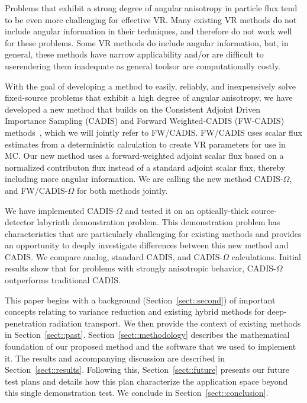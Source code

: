 \documentclass[12pt]{article}
\begin{document}
Problems that exhibit a strong degree of angular anisotropy in particle flux tend to be even more challenging for effective VR.
Many existing VR methods do not include angular information in their techniques, and therefore do not work well for these problems.  
Some VR methods do include angular information, but, in general, these methods have narrow applicability and/or are difficult to use\textemdash rendering them inadequate as general tools\textemdash or are computationally costly.

With the goal of developing a method to easily, reliably, and inexpensively solve fixed-source problems that exhibit a high degree of angular anisotropy, we have developed a new method that builds on the Consistent Adjoint Driven Importance Sampling (CADIS) and Forward Weighted-CADIS (FW-CADIS) methods~\cite{wagner_forward-weighted_2007}, which we will jointly refer to FW/CADIS. 
FW/CADIS uses scalar flux estimates from a deterministic calculation to create VR parameters for use in MC.
Our new method uses a forward-weighted adjoint scalar flux based on a normalized contributon flux instead of a standard adjoint scalar flux, thereby including more angular information. 
We are calling the new method CADIS-$\Omega$, and FW/CADIS-$\Omega$ for both methods jointly.

We have implemented CADIS-$\Omega$ and tested it on an optically-thick source-detector labyrinth demonstration problem.
This demonstration problem has characteristics that are particularly challenging for existing methods and provides an opportunity to deeply investigate differences between this new method and CADIS.
We compare analog, standard CADIS, and CADIS-$\Omega$ calculations. 
Initial results show that for problems with strongly anisotropic behavior, CADIS-$\Omega$ outperforms traditional CADIS.

This paper begins with a background (Section~\ref{sect::second}) of important concepts relating to variance reduction and existing hybrid methods for deep-penetration radiation transport. 
We then provide the context of existing methods in Section~\ref{sect::past}. 
Section~\ref{sect::methodology} describes the mathematical foundation of our proposed method and the software that we used to implement it. 
The results and accompanying discussion are described in Section~\ref{sect::results}. Following this, Section~\ref{sect::future} presents our future test plans and details how this plan characterize the application space beyond this single demonstration test. 
We conclude in Section~\ref{sect::conclusion}. 
\end{document}
